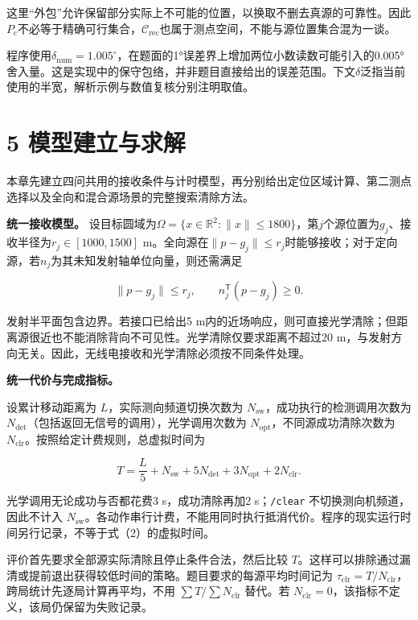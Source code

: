 \documentclass[UTF8,fontset=none,zihao=-4,a4paper]{ctexart}
\begin{document}
这里``外包''允许保留部分实际上不可能的位置，以换取不删去真源的可靠性。因此\(P_c\)不必等于精确可行集合，\(\mathcal C_{\mathrm{rec}}\)也属于测点空间，不能与源位置集合混为一谈。

程序使用\(\delta_{\mathrm{num}}=1.005^\circ\)，在题面的1°误差界上增加两位小数读数可能引入的0.005°舍入量。这是实现中的保守包络，并非题目直接给出的误差范围。下文\(\delta\)泛指当前使用的半宽，解析示例与数值复核分别注明取值。

\section{5 模型建立与求解}\label{ux6a21ux578bux5efaux7acbux4e0eux6c42ux89e3}

本章先建立四问共用的接收条件与计时模型，再分别给出定位区域计算、第二测点选择以及全向和混合源场景的完整搜索清除方法。

\textbf{统一接收模型。} 设目标圆域为\(\Omega=\{x\in\mathbb R^2:\|x\|\le1800\}\)，第\(j\)个源位置为\(g_j\)、接收半径为\(r_j\in[1000,1500]\) m。全向源在\(\|p-g_j\|\le r_j\)时能够接收；对于定向源，若\(n_j\)为其未知发射轴单位向量，则还需满足

\[
\|p-g_j\|\le r_j,\qquad n_j^\mathsf T(p-g_j)\ge0. \tag{1}
\]

发射半平面包含边界。若接口已给出5 m内的近场响应，则可直接光学清除；但距离源很近也不能消除背向不可见性。光学清除仅要求距离不超过20 m，与发射方向无关。因此，无线电接收和光学清除必须按不同条件处理。

\textbf{统一代价与完成指标。}

设累计移动距离为 \(L\)，实际测向频道切换次数为 \(N_{\mathrm{sw}}\)，成功执行的检测调用次数为 \(N_{\mathrm{det}}\)（包括返回无信号的调用），光学调用次数为 \(N_{\mathrm{opt}}\)，不同源成功清除次数为 \(N_{\mathrm{clr}}\)。按照给定计费规则，总虚拟时间为

\[
T=\frac{L}{5}+N_{\mathrm{sw}}+5N_{\mathrm{det}}+3N_{\mathrm{opt}}+2N_{\mathrm{clr}}. \tag{2}
\]

光学调用无论成功与否都花费3 s，成功清除再加2 s；\texttt{/clear} 不切换测向机频道，因此不计入 \(N_{\mathrm{sw}}\)。各动作串行计费，不能用同时执行抵消代价。程序的现实运行时间另行记录，不等于式（2）的虚拟时间。

评价首先要求全部源实际清除且停止条件合法，然后比较 \(T\)。这样可以排除通过漏清或提前退出获得较低时间的策略。题目要求的每源平均时间记为 \(\tau_{\mathrm{clr}}=T/N_{\mathrm{clr}}\)，跨局统计先逐局计算再平均，不用 \(\sum T/\sum N_{\mathrm{clr}}\) 替代。若 \(N_{\mathrm{clr}}=0\)，该指标不定义，该局仍保留为失败记录。
\end{document}
